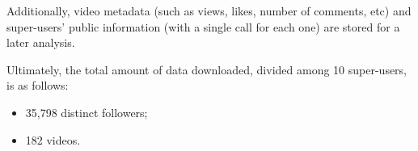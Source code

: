 Additionally, video metadata (such as views, likes, number of comments, etc) and super-users' public information (with a single call for each one) are stored for a later analysis. 

Ultimately, the total amount of data downloaded, divided among 10 super-users, is as follows:
\begin{itemize}
    \item 35,798 distinct followers;
    \item 182 videos.
\end{itemize}